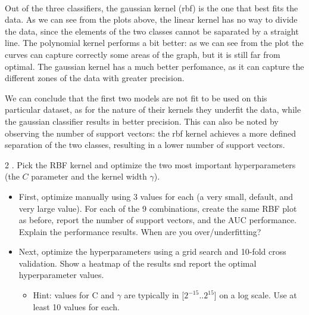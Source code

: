 \documentclass[11pt]{article}
\providecommand{\tightlist}{%
      \setlength{\itemsep}{0pt}\setlength{\parskip}{0pt}}
\begin{document}
    \begin{center}
    \end{center}
    { \hspace*{\fill} \\}
    
    Out of the three classifiers, the gaussian kernel (rbf) is the one that
best fits the data. As we can see from the plots above, the linear
kernel has no way to divide the data, since the elements of the two
classes cannot be saparated by a straight line. The polynomial kernel
performs a bit better: as we can see from the plot the curves can
capture correctly some areas of the graph, but it is still far from
optimal. The gaussian kernel has a much better perfomance, as it can
capture the different zones of the data with greater precision.

We can conclude that the first two models are not fit to be used on this
particular dataset, as for the nature of their kernels they underfit the
data, while the gaussian classifier results in better precision. This
can also be noted by observing the number of support vectors: the rbf
kernel achieves a more defined separation of the two classes, resulting
in a lower number of support vectors.

    2 . Pick the RBF kernel and optimize the two most important
hyperparameters (the \(C\) parameter and the kernel width \(\gamma\)).

\begin{itemize}
\tightlist
\item
  First, optimize manually using 3 values for each (a very small,
  default, and very large value). For each of the 9 combinations, create
  the same RBF plot as before, report the number of support vectors, and
  the AUC performance. Explain the performance results. When are you
  over/underfitting?
\item
  Next, optimize the hyperparameters using a grid search and 10-fold
  cross validation. Show a heatmap of the results snd report the optimal
  hyperparameter values.

  \begin{itemize}
  \tightlist
  \item
    Hint: values for C and \(\gamma\) are typically in
    {[}\(2^{-15}..2^{15}\){]} on a log scale. Use at least 10 values for
    each.
  \end{itemize}
\end{itemize}
\end{document}
